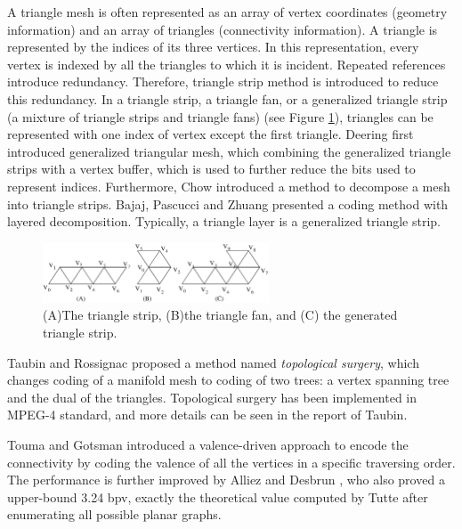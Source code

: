 \documentclass[11pt, a4paper]{report}
\begin{document}
    A triangle mesh is often represented as an array of vertex coordinates
    (geometry information) and an array of triangles (connectivity information). 
    A triangle is represented by the indices of its three vertices.
    In this representation, every vertex is indexed by all the
    triangles to which it is incident. Repeated references introduce
    redundancy. Therefore, triangle strip method is introduced to
    reduce this redundancy. In a triangle strip, a triangle fan, or a
    generalized triangle strip (a mixture of triangle strips and
    triangle fans) (see Figure \ref{strip}), 
    triangles can be represented with one index of vertex
    except the first triangle. 
    Deering \cite{218391} first introduced generalized triangular mesh, 
    which combining the generalized triangle strips with a vertex buffer,
    which is used to further reduce the bits used to represent indices. 
    Furthermore, Chow \cite{267103} introduced a method to
    decompose a mesh into triangle strips. 
    Bajaj, Pascucci and Zhuang \cite{789628} presented a coding method with layered
    decomposition. 
    Typically, a triangle layer is a generalized triangle strip. 
    \begin{figure}[ht]
    \centering
    \includegraphics[width=0.6\textwidth]{strip.eps}
    \caption{(A)The triangle strip, (B)the triangle fan, and (C) the generated triangle strip.}\label{strip}
    \end{figure}

    Taubin and Rossignac \cite{274365} proposed a method named
    \emph{topological surgery}, which changes coding of a manifold
    mesh to coding of two trees: a vertex spanning tree and the dual of the triangles.
    Topological surgery has been implemented in MPEG-4 standard, and more details
    can be seen in the report of Taubin\cite{3d:Taubin}.
    
    Touma and Gotsman \cite{triangle:Touma} introduced a
    valence-driven approach to encode the connectivity by coding the
    valence of all the vertices in a specific traversing order. 
    The performance is further improved
    by Alliez and Desbrun \cite{alliez01valencedriven}, who also proved a
    upper-bound 3.24 bpv, exactly the theoretical value computed
    by Tutte \cite{census:Tutte} after enumerating all possible planar
    graphs.
\end{document}
